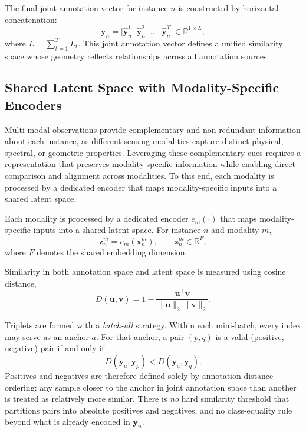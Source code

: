 \documentclass[lettersize,journal]{IEEEtran}
\begin{document}
The final joint annotation vector for instance $n$ is constructed by horizontal
concatenation:
\begin{equation}
\label{eq:ann-concat}
\mathbf{y}_{n}
=
\big[
\hat{\mathbf{y}}^{1}_{n}
\;\;
\hat{\mathbf{y}}^{2}_{n}
\;\;
\dots
\;\;
\hat{\mathbf{y}}^{T}_{n}
\big]
\in
\mathbb{R}^{1 \times L},
\end{equation}
where $L = \sum_{t=1}^{T} L_t$.
This joint annotation vector defines a unified similarity space whose geometry
reflects relationships across all annotation sources.


\subsection{Shared Latent Space with Modality-Specific Encoders}
\label{subsec:shared-latent-space}
Multi-modal observations provide complementary and non-redundant information about each instance, as different sensing modalities capture distinct physical, spectral, or geometric properties. Leveraging these complementary cues requires a representation that preserves modality-specific information while enabling direct comparison and alignment across modalities. To this end, each modality is processed by a dedicated encoder that maps modality-specific inputs into a shared latent space.

Each modality is processed by a dedicated encoder
$e_m(\cdot)$ that maps modality-specific inputs into a shared latent space.
For instance $n$ and modality $m$,
\begin{equation}
\mathbf{z}_n^{m}
=
e_m\!\left(\mathbf{x}_n^{m}\right),
\qquad
\mathbf{z}_n^{m} \in \mathbb{R}^{F},
\end{equation}
where $F$ denotes the shared embedding dimension.

Similarity in both annotation space and latent space is measured using cosine
distance,
\begin{equation}
D(\mathbf{u},\mathbf{v})
=
1 -
\frac{
\mathbf{u}^{\top}\mathbf{v}
}{
\|\mathbf{u}\|_2 \|\mathbf{v}\|_2
}.
\end{equation}

Triplets are formed with a \emph{batch-all} strategy. Within each mini-batch, every index may serve as an anchor $a$. For that anchor, a pair $(p,q)$ is a valid (positive, negative) pair if and only if
\begin{equation}
\label{eq:triplet-order}
D(\mathbf{y}_a,\mathbf{y}_p)
<
D(\mathbf{y}_a,\mathbf{y}_q).
\end{equation}
Positives and negatives are therefore defined solely by annotation-distance ordering: any sample closer to the anchor in joint annotation space than another is treated as relatively more similar. There is \emph{no} hard similarity threshold that partitions pairs into absolute positives and negatives, and no class-equality rule beyond what is already encoded in $\mathbf{y}_n$.
\end{document}
